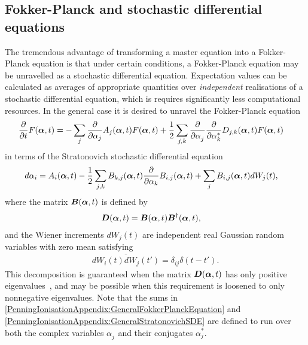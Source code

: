 \subsection{Fokker-Planck and stochastic differential equations}
The tremendous advantage of transforming a master equation into a Fokker-Planck equation is that under certain conditions, a Fokker-Planck equation may be unravelled as a stochastic differential equation. Expectation values can be calculated as averages of appropriate quantities over \emph{independent} realisations of a stochastic differential equation, which is requires significantly less computational resources. In the general case it is desired to unravel the Fokker-Planck equation
\begin{align}
    \frac{\partial}{\partial t}F(\vect{\alpha}, t) &= - \sum_j \frac{\partial}{\partial \alpha_j} A_j(\vect{\alpha}, t) F(\vect{\alpha}, t) + \frac{1}{2} \sum_{j, k} \frac{\partial}{\partial \alpha_j^{\phantom{*}}} \frac{\partial}{\partial \alpha_k^*} D_{j,k}(\vect{\alpha}, t) F(\vect{\alpha}, t) \label{PenningIonisationAppendix:GeneralFokkerPlanckEquation}
\end{align}
in terms of the Stratonovich stochastic differential equation
\begin{align}
    d \alpha_i &= A_i(\vect{\alpha}, t) - \frac{1}{2} \sum_{j, k} B_{k, j}(\vect{\alpha}, t) \frac{\partial }{\partial \alpha_k}B_{i,j}(\vect{\alpha}, t) + \sum_j B_{i,j}(\vect{\alpha}, t) d W_j(t), \label{PenningIonisationAppendix:GeneralStratonovichSDE}
\end{align}
where the matrix $\bm{B}(\bm{\alpha}, t)$ is defined by
\begin{align}
    \bm{D}(\bm{\alpha}, t) &= \bm{B}(\bm{\alpha}, t) \bm{B}^\dagger(\bm{\alpha}, t),
\end{align}
and the Wiener increments $d W_j(t)$ are independent real Gaussian random variables with zero mean satisfying
\begin{align}
    \overline{d W_i(t) dW_j(t')} = \delta_{i j}\delta(t - t').
\end{align}
This decomposition is guaranteed when the matrix $\bm{D}(\bm{\alpha}, t)$ has only positive eigenvalues~\citep{GardinerHSM}, and may be possible when this requirement is loosened to only nonnegative eigenvalues. Note that the sums in \eqref{PenningIonisationAppendix:GeneralFokkerPlanckEquation} and \eqref{PenningIonisationAppendix:GeneralStratonovichSDE} are defined to run over both the complex variables $\alpha_j^{\phantom{*}}$ and their conjugates $\alpha_j^*$.


